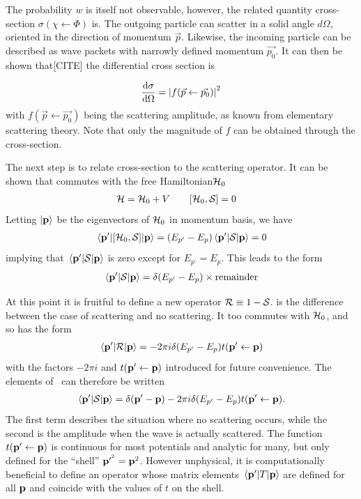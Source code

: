 The probability \(w\) is itself not observable, however, the related quantity
cross-section \mbox{\(\sigma(\chi \leftarrow \Phi)\)} is. The outgoing particle can
scatter in a solid angle \(d\Omega\), oriented in the direction of momentum
\(\vec{p}\). Likewise, the incoming particle can be described as wave packets
with narrowly defined momentum \(\vec{p_{0}}\). It can then be shown that[CITE] the
differential cross section is

\begin{align*}
  \dv{\sigma}{\Omega}(\vec{p}\leftarrow\vec{p_{0}}) = \left| f(\vec{p}\leftarrow\vec{p_{0}}) \right|^{2}
\end{align*}
with \(f(\vec{p}\leftarrow \vec{p_{0}})\) being the scattering amplitude, as known from elementary scattering
theory. Note that only the magnitude of \(f\) can be obtained through the
cross-section.

The next step is to relate cross-section to the scattering operator. It
can be shown that \mscat{} commutes with the free Hamiltonian\( \mathcal{H}_{0}\)
\begin{align*}
  \mathcal{H} = \mathcal{H}_{0} + V &\qquad [\mathcal{H}_{0}, \mathcal{S}{}] = 0
\end{align*}
Letting \(\ket{\vb{p}}\) be the eigenvectors of \(\mathcal{H}_{0}\) in momentum
basis, we have
\begin{align*}
  \mel{\vb{p}^{\prime}}{[\mathcal{H}_{0}, \mathcal{S}]}{\vb{p}} = (E_{p^{\prime}}-E_{p})\mel{\vb{p}^{\prime}}{\mathcal{S}}{\vb{p}} = 0
\end{align*}
implying that \(\mel{\vb{p}^{\prime}}{\mathcal{S}}{\vb{p}}\) is zero except for
\(E_{p^{\prime}}=E_{p}\). This leads to the form
\begin{align*}
  \mel{\vb{p}^{\prime}}{\mathcal{S}}{\vb{p}} = \delta(E_{p^{\prime}}-E_{p})\times\text{remainder}
\end{align*}

At this point it is fruitful to define a new operator \(\mathcal{R} \equiv 1 -
\mathcal{S}\).  is the difference between the case of scattering and no scattering. It too commutes with \(\mathcal{H}_{0}\), and so has the form
\begin{align*}
  \mel{\vb{p}^{\prime}}{\mathcal{R}}{\vb{p}} = -2\pi i\delta(E_{p^{\prime}}-E_{p})t(\vb{p}^{\prime}\leftarrow \vb{p})
\end{align*}
with the factors \(-2\pi i\) and \(t(\vb{p}^{\prime}\leftarrow\vb{p})\)
introduced for future convenience. The elements of\ \mscat{} can therefore be written 
\begin{align*}
  \mel{\vb{p}^{\prime}}{\mathcal{S}}{\vb{p}} = \delta(\vb{p}^{\prime} - \vb{p}) - 2\pi i \delta(E_{p^{\prime}}-E_{p})t(\vb{p}^{\prime}\leftarrow \vb{p}).
\end{align*}
The first term describes the situation where no scattering occurs, while the
second is the amplitude when the wave is actually scattered. The function
\(t(\vb{p}^{\prime}\leftarrow \vb{p})\) is continuous for most potentials and
analytic for many, but only defined for the ``shell'' \(\vb{p}^{{\prime}^{2}} =
\vb{p}^{2}\). However unphysical, it is computationally beneficial to define an
operator  whose matrix elements \(\mel{\vb{p}^{\prime}}{T}{\vb{p}}\) are defined for all \(\vb{p}\) and
coincide with the values of \(t\) on the shell.

